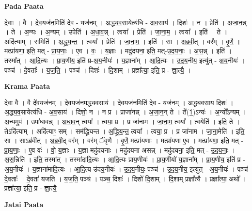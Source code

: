 \documentclass[17pt]{extarticle}
\begin{document}
\textbf{Pada Paata} \newline

दे॒वाः । वै । दे॒व॒यज॑न॒मिति॑ देव - यज॑नम् । अ॒द्ध्य॒व॒सायेत्य॑धि - अ॒व॒साय॑ । दिशः॑ । न । प्रेति॑ । अ॒जा॒न॒न्न् । ते । अ॒न्यः । अ॒न्यम् । उपेति॑ । अ॒धा॒व॒न्न् । त्वया᳚ । प्रेति॑ । जा॒ना॒म॒ । त्वया᳚ । इति॑ । ते । अदि॑त्याम् । समिति॑ । अ॒द्ध्र॒य॒न्त॒ । त्वया᳚ । प्रेति॑ । जा॒ना॒म॒ । इति॑ । सा । अ॒ब्र॒वी॒त् । वर᳚म् । वृ॒णै॒ । मत्प्रा॑यणा॒ इति॒ मत् - प्रा॒य॒णाः॒ । ए॒व । वः॒ । य॒ज्ञाः । मदु॑दयना॒ इति॒ मत्-उ॒द॒य॒नाः॒ । अ॒स॒न्न् । इति॑ । तस्मा᳚त् । आ॒दि॒त्यः । प्रा॒य॒णीय॒ इति॑ प्र-अ॒य॒नीयः॑ । य॒ज्ञाना᳚म् । आ॒दि॒त्यः । उ॒द॒य॒नीय॒ इत्यु॑त् - अ॒य॒नीयः॑ । पञ्च॑ । दे॒वताः᳚ । य॒ज॒ति॒ । पञ्च॑ । दिशः॑ । दि॒शाम् । प्रज्ञा᳚त्या॒ इति॒ प्र - ज्ञा॒त्यै॒ ।  \newline


\textbf{Krama Paata} \newline

दे॒वा वै । वै दे॑व॒यज॑नम् । दे॒व॒यज॑नमद्ध्यव॒साय॑ । दे॒व॒यज॑न॒मिति॑ देव - यज॑नम् । अ॒द्ध्य॒व॒साय॒ दिशः॑ । अ॒द्ध्य॒व॒सायेत्य॑धि - अ॒व॒साय॑ । दिशो॒ न । न प्र । प्राजा॑नन्न् । अ॒जा॒न॒न् ते । ते᳚(1॒)ऽन्यः॑ । अ॒न्यो᳚ऽन्यम् । अ॒न्यमुप॑ । उपा॑धावन्न् । अ॒धा॒व॒न् त्वया᳚ । त्वया॒ प्र । प्र जा॑नाम । जा॒ना॒म॒ त्वया᳚ । त्वयेति॑ । इति॒ ते । तेऽदि॑त्याम् । अदि॑त्याꣳ॒॒ सम् । सम॑द्ध्रियन्त । अ॒द्ध्रि॒य॒न्त॒ त्वया᳚ । त्वया॒ प्र । प्र जा॑नाम । जा॒ना॒मेति॑ । इति॒ सा । साऽब्र॑वीत् । अ॒ब्र॒वी॒द् वर᳚म् । वर॑म् ॅवृणै । वृ॒णै॒ मत्प्रा॑यणाः । मत्प्रा॑यणा ए॒व । मत्प्रा॑यणा॒ इति॒ मत् - प्रा॒य॒णाः॒ । ए॒व वः॑ । वो॒ य॒ज्ञाः । य॒ज्ञा मदु॑दयनाः । मदु॑दयना असन्न् । मदु॑दयना॒ इति॒ मत् - उ॒द॒य॒नाः॒ । अ॒स॒न्निति॑ । इति॒ तस्मा᳚त् । तस्मा॑दादि॒त्यः । आ॒दि॒त्यः प्रा॑य॒णीयः॑ । प्रा॒य॒णीयो॑ य॒ज्ञाना᳚म् । प्रा॒य॒णीय॒ इति॑ प्र - अ॒य॒नीयः॑ । य॒ज्ञाना॑मादि॒त्यः । आ॒दि॒त्य उ॑दय॒नीयः॑ । उ॒द॒य॒नीयः॒ पञ्च॑ । उ॒द॒य॒नीय॒ इत्यु॑त् - अ॒य॒नीयः॑ । पञ्च॑ दे॒वताः᳚ । दे॒वता॑ यजति । य॒ज॒ति॒ पञ्च॑ । पञ्च॒ दिशः॑ । दिशो॑ दि॒शाम् । दि॒शाम् प्रज्ञा᳚त्यै । प्रज्ञा᳚त्या॒ अथो᳚ । प्रज्ञा᳚त्या॒ इति॒ प्र - ज्ञा॒त्यै॒ \newline

\textbf{Jatai Paata} \newline
\end{document}

